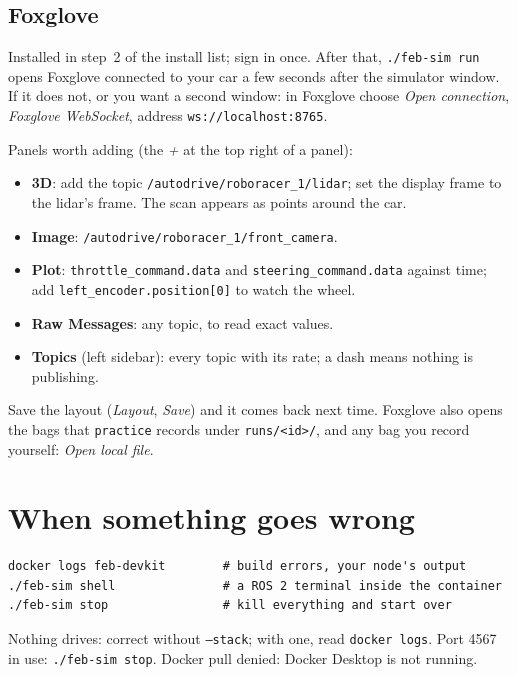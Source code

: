 \documentclass[11pt,a4paper]{article}
\begin{document}
\subsection*{Foxglove}

Installed in step~2 of the install list; sign in once. After that, \texttt{./feb-sim run} opens
Foxglove connected to your car a few seconds after the simulator window. If it does not, or
you want a second window: in Foxglove choose \emph{Open connection}, \emph{Foxglove WebSocket},
address \texttt{ws://localhost:8765}.

Panels worth adding (the \emph{+} at the top right of a panel):
\begin{itemize}
  \item \textbf{3D}: add the topic \texttt{/autodrive/roboracer\_1/lidar}; set the display frame to the lidar's frame. The scan appears as points around the car.
  \item \textbf{Image}: \texttt{/autodrive/roboracer\_1/front\_camera}.
  \item \textbf{Plot}: \texttt{throttle\_command.data} and \texttt{steering\_command.data} against time; add \texttt{left\_encoder.position[0]} to watch the wheel.
  \item \textbf{Raw Messages}: any topic, to read exact values.
  \item \textbf{Topics} (left sidebar): every topic with its rate; a dash means nothing is publishing.
\end{itemize}

Save the layout (\emph{Layout}, \emph{Save}) and it comes back next time. Foxglove also opens the
bags that \texttt{practice} records under \texttt{runs/<id>/}, and any bag you record yourself:
\emph{Open local file}.

\section{When something goes wrong}

\begin{lstlisting}
docker logs feb-devkit        # build errors, your node's output
./feb-sim shell               # a ROS 2 terminal inside the container
./feb-sim stop                # kill everything and start over
\end{lstlisting}

Nothing drives: correct without \texttt{--stack}; with one, read \texttt{docker logs}.
Port 4567 in use: \texttt{./feb-sim stop}. Docker pull denied: Docker Desktop is not running.
\end{document}
